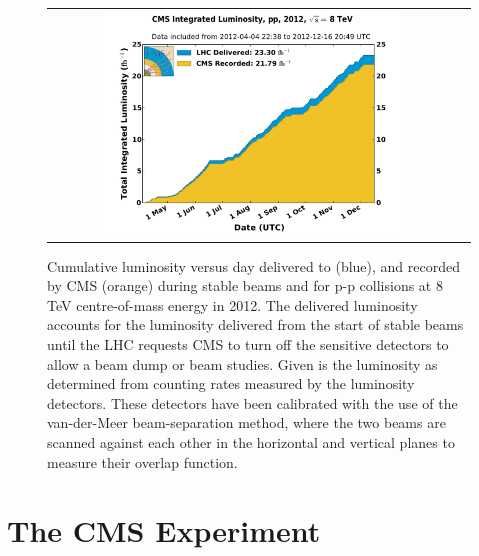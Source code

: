 \begin{figure}[tbh!]
	\centering
	\begin{tabular}{cc}
		\includegraphics[width=0.75\textwidth]{detector/pics/int_lumi_per_day_cumulative_pp_2012.pdf}
	\end{tabular}
	\caption{Cumulative luminosity versus day delivered to (blue), and recorded by CMS (orange) during stable beams and for p-p collisions at 8 TeV centre-of-mass energy in 2012. The delivered luminosity accounts for the luminosity delivered from the start of stable beams until the LHC requests CMS to turn off the sensitive detectors to allow a beam dump or beam studies. Given is the luminosity as determined from counting rates measured by the luminosity detectors. These detectors have been calibrated with the use of the van-der-Meer beam-separation method, where the two beams are scanned against each other in the horizontal and vertical planes to measure their overlap function.}
	\label{fig:lumi_2012}
\end{figure}

\section{The CMS Experiment}

